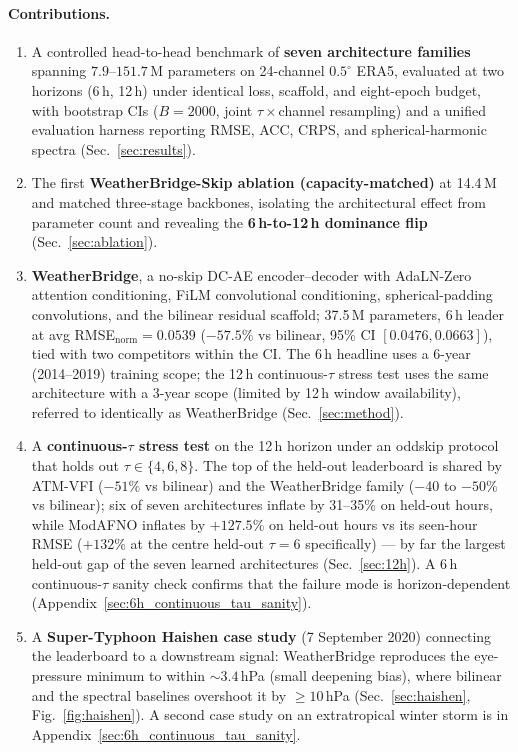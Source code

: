 \documentclass[10pt,letterpaper,twocolumn]{article}
\begin{document}
\paragraph{Contributions.}
\begin{enumerate}[topsep=2pt,itemsep=2pt,leftmargin=*]
\item A controlled head-to-head benchmark of \textbf{seven architecture
families} spanning $7.9$--$151.7$\,M parameters on 24-channel
$0.5^\circ$ ERA5, evaluated at two horizons (6\,h, 12\,h) under
identical loss, scaffold, and eight-epoch budget, with bootstrap CIs
($B{=}2000$, joint $\tau{\times}$channel resampling) and a unified
evaluation harness reporting RMSE, ACC, CRPS, and spherical-harmonic
spectra (Sec.~\ref{sec:results}).
\item The first \textbf{WeatherBridge-Skip ablation (capacity-matched)}
at 14.4\,M and matched three-stage backbones, isolating the
architectural effect from parameter count and revealing the
\textbf{6\,h-to-12\,h dominance flip} (Sec.~\ref{sec:ablation}).
\item \textbf{WeatherBridge}, a no-skip DC-AE encoder--decoder with
AdaLN-Zero attention conditioning, FiLM convolutional conditioning,
spherical-padding convolutions, and the bilinear residual scaffold;
37.5\,M parameters, 6\,h leader at avg
RMSE$_{\text{norm}}{=}0.0539$ ($-57.5\%$ vs bilinear, 95\% CI
$[0.0476, 0.0663]$), tied with two competitors within the CI. The 6\,h
headline uses a 6-year (2014--2019) training scope; the 12\,h
continuous-$\tau$ stress test uses the same architecture with a
3-year scope (limited by 12\,h window availability), referred to
identically as WeatherBridge
(Sec.~\ref{sec:method}).
\item A \textbf{continuous-$\tau$ stress test} on the 12\,h horizon
under an oddskip protocol that holds out $\tau \in \{4, 6, 8\}$. The
top of the held-out leaderboard is shared by ATM-VFI
($-51\%$ vs bilinear) and the WeatherBridge family ($-40$ to $-50\%$
vs bilinear); six of seven architectures inflate by 31--35\%
on held-out hours, while ModAFNO inflates by $+127.5\%$ on held-out hours
vs its seen-hour RMSE ($+132\%$ at the centre held-out $\tau{=}6$
specifically) --- by far the largest held-out gap of the seven learned
architectures (Sec.~\ref{sec:12h}). A 6\,h continuous-$\tau$ sanity
check confirms that the failure mode is horizon-dependent
(Appendix~\ref{sec:6h_continuous_tau_sanity}).
\item A \textbf{Super-Typhoon Haishen case study} (7 September 2020)
connecting the leaderboard to a downstream signal: WeatherBridge
reproduces the eye-pressure minimum to within $\sim 3.4$\,hPa (small
deepening bias), where bilinear and the spectral baselines overshoot
it by $\ge 10$\,hPa
(Sec.~\ref{sec:haishen}, Fig.~\ref{fig:haishen}). A second
case study on an extratropical winter storm is in
Appendix~\ref{sec:6h_continuous_tau_sanity}.
\end{enumerate}
\end{document}
